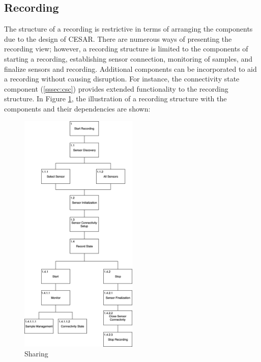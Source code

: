 
\subsection{Recording}
The structure of a recording is restrictive in terms of arranging the components due to the design of CESAR. There are numerous ways of presenting the recording view; however, a recording structure is limited to the components of starting a recording, establishing sensor connection, monitoring of samples, and finalize sensors and recording. Additional components can be incorporated to aid a recording without causing disruption. For instance, the connectivity state component (\ref{sssec:csc}) provides extended functionality to the recording structure. In Figure \ref{fig:hta_recording}, the illustration of a recording structure with the components and their dependencies are shown:

\begin{figure}
    \centering
    \includegraphics[width=0.5\textwidth]{images/Recording.png}
    \caption{Sharing}
    \label{fig:hta_recording}
\end{figure}

